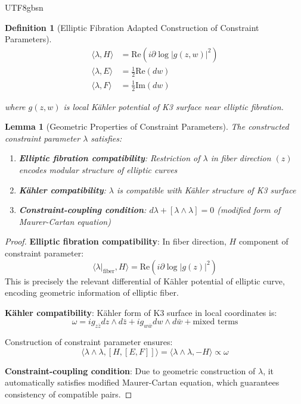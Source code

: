 \documentclass[a4paper,12pt]{extarticle}
\newtheorem{lemma}[theorem]{Lemma}
\newtheorem{definition}[theorem]{Definition}
\theoremstyle{definition}
\begin{document}
\begin{CJK}{UTF8}{gbsn}
\begin{definition}[Elliptic Fibration Adapted Construction of Constraint Parameters]
\begin{align}
\langle\lambda, H\rangle &= \text{Re}(i \partial \log |g(z,w)|^2) \label{eq:lambda_H}\\
\langle\lambda, E\rangle &= \frac{1}{2}\text{Re}(dw) \label{eq:lambda_E}\\
\langle\lambda, F\rangle &= \frac{1}{2}\text{Im}(dw) \label{eq:lambda_F}
\end{align}

where $g(z,w)$ is local Kähler potential of K3 surface near elliptic fibration.
\end{definition}

\begin{lemma}[Geometric Properties of Constraint Parameters]
\label{lem:constraint_parameter_properties}
The constructed constraint parameter $\lambda$ satisfies:
\begin{enumerate}
\item \textbf{Elliptic fibration compatibility}: Restriction of $\lambda$ in fiber direction $(z)$ encodes modular structure of elliptic curves
\item \textbf{Kähler compatibility}: $\lambda$ is compatible with Kähler structure of K3 surface
\item \textbf{Constraint-coupling condition}: $d\lambda + [\lambda \wedge \lambda] = 0$ (modified form of Maurer-Cartan equation)
\end{enumerate}
\end{lemma}

\begin{proof}
\textbf{Elliptic fibration compatibility}:
In fiber direction, $H$ component of constraint parameter:
$$\langle\lambda|_{\text{fiber}}, H\rangle = \text{Re}(i \partial \log |g(z)|^2)$$
This is precisely the relevant differential of Kähler potential of elliptic curve, encoding geometric information of elliptic fiber.

\textbf{Kähler compatibility}:
Kähler form of K3 surface in local coordinates is:
$$\omega = i g_{z\bar{z}} dz \wedge d\bar{z} + i g_{w\bar{w}} dw \wedge d\bar{w} + \text{mixed terms}$$

Construction of constraint parameter ensures:
$$\langle\lambda \wedge \lambda, [H, [E, F]]\rangle = \langle\lambda \wedge \lambda, -H\rangle \propto \omega$$

\textbf{Constraint-coupling condition}:
Due to geometric construction of $\lambda$, it automatically satisfies modified Maurer-Cartan equation, which guarantees consistency of compatible pairs.
\end{proof}



\end{CJK}
\end{document}

